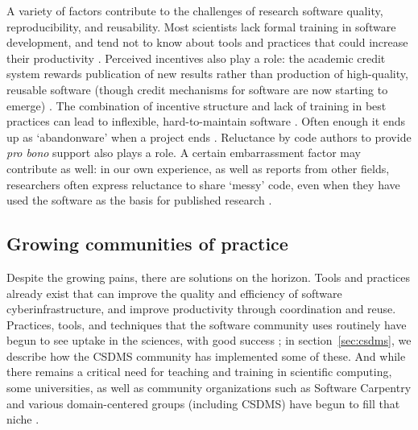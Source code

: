 \documentclass[12pt]{amsart}
\begin{document}
A variety of factors contribute to the challenges of research software quality, reproducibility, and reusability. Most scientists lack formal training in software development, and tend not to know about tools and practices that could increase their productivity \citep{kelly2007software,basili2008understanding,faulk2009scientific,hannay2009scientists,hwang2017software,alnoamany2018towards,pinto2018scientists,kellogg2018role}. Perceived incentives also play a role: the academic credit system rewards publication of new results rather than production of high-quality, reusable software (though credit mechanisms for software are now starting to emerge) \citep{leveque2009python,howison2011scientific,morin2012shining,turk2013scaling,ahalt2014water,poisot2015best,hwang2017software,wiese2019naming}. The combination of incentive structure and lack of training in best practices can lead to inflexible, hard-to-maintain software \citep{brown2014run,johanson2018software}. Often enough it ends up as `abandonware' when a project ends \citep{barnes2010publish}. Reluctance by code authors to provide \textit{pro bono} support also plays a role. A certain embarrassment factor may contribute as well: in our own experience, as well as reports from other fields, researchers often express reluctance to share `messy' code, even when they have used the software as the basis for published research \citep{barnes2010publish,morin2012shining,leveque2013top}.



\subsection{Growing communities of practice}

Despite the growing pains, there are solutions on the horizon. Tools and practices already exist that can improve the quality and efficiency of software cyberinfrastructure, and improve productivity through coordination and reuse. Practices, tools, and techniques that the software community uses routinely have begun to see uptake in the sciences, with good success \citep{bangerth2013makes,turk2013scaling,hastings2014ten,wilson2014best,brown2014run,poisot2015best,hwang2017software,nanthaamornphong2017test,scott2017esip,taschuk2017ten,wilson2017good,benureau2018re,bryan2018excuse,adorf2018professionally,lathrop2019introduction}; in section~\ref{sec:csdms}, we describe how the CSDMS community has implemented some of these. And while there remains a critical need for teaching and training in scientific computing, some universities, as well as community organizations such as Software Carpentry and various domain-centered groups (including CSDMS) have begun to fill that niche \citep[e.g.,][]{jacobs2016experiences}. 
\end{document}
